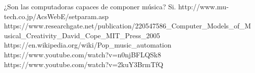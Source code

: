 ¿Son las computadoras capaces de componer música?
Si. http://www.mu-tech.co.jp/AcsWebE/setparam.asp
https://www.researchgate.net/publication/220547586_Computer_Models_of_Musical_Creativity_David_Cope_MIT_Press_2005
https://en.wikipedia.org/wiki/Pop_music_automation
https://www.youtube.com/watch?v=n0njBFLQSk8
https://www.youtube.com/watch?v=2kuY3BrmTfQ